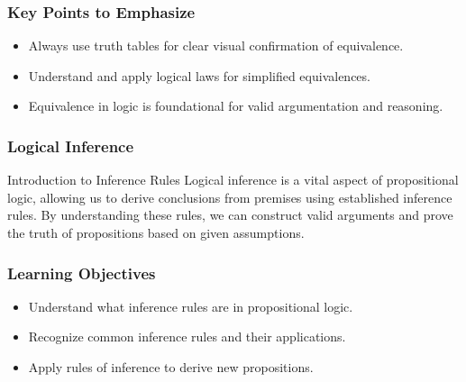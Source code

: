 \documentclass[aspectratio=169]{beamer}
\begin{document}
\begin{frame}[fragile]
    \frametitle{Key Points to Emphasize}
    \begin{itemize}
        \item Always use truth tables for clear visual confirmation of equivalence.
        \item Understand and apply logical laws for simplified equivalences.
        \item Equivalence in logic is foundational for valid argumentation and reasoning.
    \end{itemize}
\end{frame}

\begin{frame}[fragile]
    \frametitle{Logical Inference}
    \begin{block}{Introduction to Inference Rules}
        Logical inference is a vital aspect of propositional logic, allowing us to derive conclusions from premises using established inference rules. By understanding these rules, we can construct valid arguments and prove the truth of propositions based on given assumptions.
    \end{block}
\end{frame}

\begin{frame}[fragile]
    \frametitle{Learning Objectives}
    \begin{itemize}
        \item Understand what inference rules are in propositional logic.
        \item Recognize common inference rules and their applications.
        \item Apply rules of inference to derive new propositions.
    \end{itemize}
\end{frame}
\end{document}
